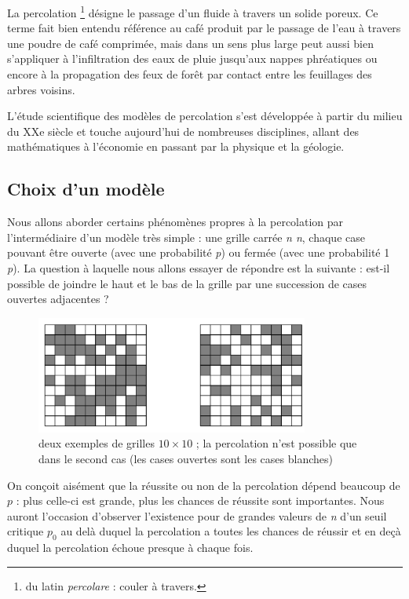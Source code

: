 
La percolation \footnote{du latin \emph{percolare} : couler à travers.} désigne le passage d'un fluide à
travers un solide poreux. Ce terme fait bien entendu référence au café
produit par le passage de l'eau à travers une poudre de café comprimée,
mais dans un sens plus large peut aussi bien s'appliquer à
l'infiltration des eaux de pluie jusqu'aux nappes phréatiques ou encore
à la propagation des feux de forêt par contact entre les feuillages des
arbres voisins.

L'étude scientifique des modèles de percolation s'est développée à
partir du milieu du XXe siècle et touche aujourd'hui de nombreuses
disciplines, allant des mathématiques à l'économie en passant par la
physique et la géologie.

\setcounter{section}{1}
\subsection{Choix d'un modèle}\label{choix-dun-moduxe8le}


Nous allons aborder certains phénomènes propres à la percolation par
l'intermédiaire d'un modèle très simple : une grille carrée \emph{n n},
chaque case pouvant être ouverte (avec une probabilité \emph{p}) ou
fermée (avec une probabilité 1 \emph{p}). La question à laquelle nous
allons essayer de répondre est la suivante : est-il possible de joindre
le haut et le bas de la grille par une succession de cases ouvertes
adjacentes ?
\begin{figure}[!htb]
\begin{center}
\includegraphics[width=0.8\textwidth]{illustration_perco.jpg}
\caption{deux exemples de grilles $10\times10$ ; la percolation
n'est possible que dans le second cas (les cases ouvertes sont les cases
blanches)}
\end{center}
\end{figure}




On conçoit aisément que la réussite ou non de la percolation dépend
beaucoup de $p$ : plus celle-ci est grande, plus les chances de
réussite sont importantes. Nous auront l'occasion d'observer l'existence
pour de grandes valeurs de \emph{n} d'un seuil critique
$p_0$ au delà duquel la percolation a toutes les
chances de réussir et en deçà duquel la percolation échoue presque à
chaque fois.

